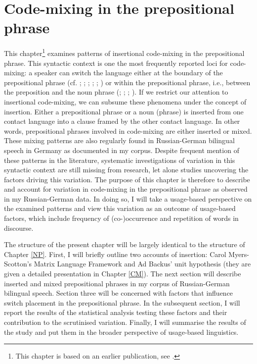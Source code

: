 \chapter{Code-mixing in the prepositional phrase}\label{PP}

This chapter\footnote{This chapter is based on an earlier publication, see \citet{reif-robinson}.} examines patterns of insertional code-mixing in the prepositional phrase. This syntactic context is one the most frequently reported loci for code-mixing: a speaker can switch the language either at the boundary of the prepositional phrase (cf. \citealt[314]{bentahila-davies-1983}; \citealt[271, 315]{boumans-syntax-1998}; \citealt[757]{clyne1987}; \citealt[169]{haust-codeswitching-1995}; \citealt[310]{pfaff-constraints-1979}; \citealt[208, 221--224]{treffers-daller-mixing-1994}) or within the prepositional phrase, i.e., between the preposition and the noun phrase (\citealt[315]{bentahila-davies-1983}; \citealt[602]{poplack-sometimes-1980}; \citealt[310]{pfaff-constraints-1979}; \citealt[173, 178]{stenson-1990}). If we restrict our attention to insertional code-mixing, we can subsume these phenomena under the concept of insertion. Either a prepositional phrase or a noun (phrase) is inserted from one contact language into a clause framed by the other contact language. In other words, prepositional phrases involved in code-mixing are either inserted or mixed. These mixing patterns are also regularly found in Russian-German bilingual speech in Germany as documented in my corpus. Despite frequent mention of these patterns in the literature, systematic investigations of  variation in this syntactic context are still missing from research, let alone studies uncovering the factors driving this variation. The purpose of this chapter is therefore to describe and account for variation in code-mixing in the prepositional phrase as observed in my Russian-German data. In doing so, I will take a usage-based perspective on the examined patterns and view this variation as an outcome of usage-based factors, which include frequency of (co-)occurrence and repetition of words in discourse.

The structure of the present chapter will be largely identical to the structure of Chapter \ref{NP}. First, I will briefly outline two accounts of insertion: Carol Myers-Scotton's Matrix Language Framework and Ad Backus' unit hypothesis (they are given a detailed presentation in Chapter \ref{CM}). The next section will describe inserted and mixed prepositional phrases in my corpus of Russian-German bilingual speech. Section three will be concerned with factors that influence switch placement in the prepositional phrase. In the subsequent section, I will report the results of the statistical analysis testing these factors and their contribution to the scrutinised variation. Finally, I will summarise the results of the study and put them in the broader perspective of usage-based linguistics.

